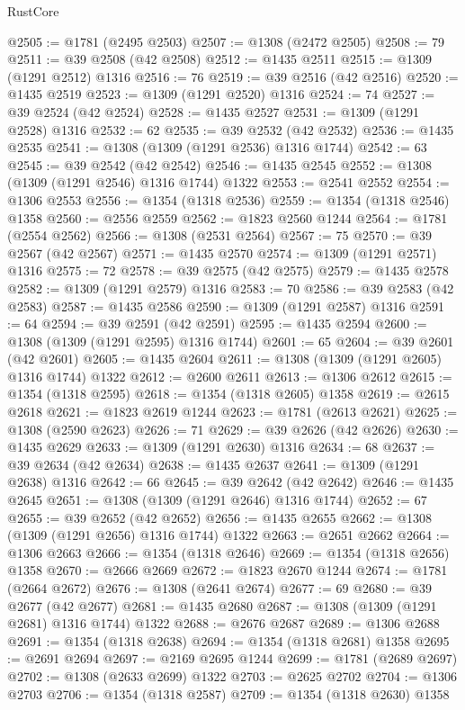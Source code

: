 \begin{lexlean}{RustCore}
\begin{coremodule}
@2505 := @1781 (@2495 @2503)
@2507 := @1308 (@2472 @2505)
@2508 := 79
@2511 := @39 @2508 (@42 @2508)
@2512 := @1435 @2511
@2515 := @1309 (@1291 @2512) @1316
@2516 := 76
@2519 := @39 @2516 (@42 @2516)
@2520 := @1435 @2519
@2523 := @1309 (@1291 @2520) @1316
@2524 := 74
@2527 := @39 @2524 (@42 @2524)
@2528 := @1435 @2527
@2531 := @1309 (@1291 @2528) @1316
@2532 := 62
@2535 := @39 @2532 (@42 @2532)
@2536 := @1435 @2535
@2541 := @1308 (@1309 (@1291 @2536) @1316 @1744)
@2542 := 63
@2545 := @39 @2542 (@42 @2542)
@2546 := @1435 @2545
@2552 := @1308 (@1309 (@1291 @2546) @1316 @1744) @1322
@2553 := @2541 @2552
@2554 := @1306 @2553
@2556 := @1354 (@1318 @2536)
@2559 := @1354 (@1318 @2546) @1358
@2560 := @2556 @2559
@2562 := @1823 @2560 @1244
@2564 := @1781 (@2554 @2562)
@2566 := @1308 (@2531 @2564)
@2567 := 75
@2570 := @39 @2567 (@42 @2567)
@2571 := @1435 @2570
@2574 := @1309 (@1291 @2571) @1316
@2575 := 72
@2578 := @39 @2575 (@42 @2575)
@2579 := @1435 @2578
@2582 := @1309 (@1291 @2579) @1316
@2583 := 70
@2586 := @39 @2583 (@42 @2583)
@2587 := @1435 @2586
@2590 := @1309 (@1291 @2587) @1316
@2591 := 64
@2594 := @39 @2591 (@42 @2591)
@2595 := @1435 @2594
@2600 := @1308 (@1309 (@1291 @2595) @1316 @1744)
@2601 := 65
@2604 := @39 @2601 (@42 @2601)
@2605 := @1435 @2604
@2611 := @1308 (@1309 (@1291 @2605) @1316 @1744) @1322
@2612 := @2600 @2611
@2613 := @1306 @2612
@2615 := @1354 (@1318 @2595)
@2618 := @1354 (@1318 @2605) @1358
@2619 := @2615 @2618
@2621 := @1823 @2619 @1244
@2623 := @1781 (@2613 @2621)
@2625 := @1308 (@2590 @2623)
@2626 := 71
@2629 := @39 @2626 (@42 @2626)
@2630 := @1435 @2629
@2633 := @1309 (@1291 @2630) @1316
@2634 := 68
@2637 := @39 @2634 (@42 @2634)
@2638 := @1435 @2637
@2641 := @1309 (@1291 @2638) @1316
@2642 := 66
@2645 := @39 @2642 (@42 @2642)
@2646 := @1435 @2645
@2651 := @1308 (@1309 (@1291 @2646) @1316 @1744)
@2652 := 67
@2655 := @39 @2652 (@42 @2652)
@2656 := @1435 @2655
@2662 := @1308 (@1309 (@1291 @2656) @1316 @1744) @1322
@2663 := @2651 @2662
@2664 := @1306 @2663
@2666 := @1354 (@1318 @2646)
@2669 := @1354 (@1318 @2656) @1358
@2670 := @2666 @2669
@2672 := @1823 @2670 @1244
@2674 := @1781 (@2664 @2672)
@2676 := @1308 (@2641 @2674)
@2677 := 69
@2680 := @39 @2677 (@42 @2677)
@2681 := @1435 @2680
@2687 := @1308 (@1309 (@1291 @2681) @1316 @1744) @1322
@2688 := @2676 @2687
@2689 := @1306 @2688
@2691 := @1354 (@1318 @2638)
@2694 := @1354 (@1318 @2681) @1358
@2695 := @2691 @2694
@2697 := @2169 @2695 @1244
@2699 := @1781 (@2689 @2697)
@2702 := @1308 (@2633 @2699) @1322
@2703 := @2625 @2702
@2704 := @1306 @2703
@2706 := @1354 (@1318 @2587)
@2709 := @1354 (@1318 @2630) @1358

\end{coremodule}
\end{lexlean}
